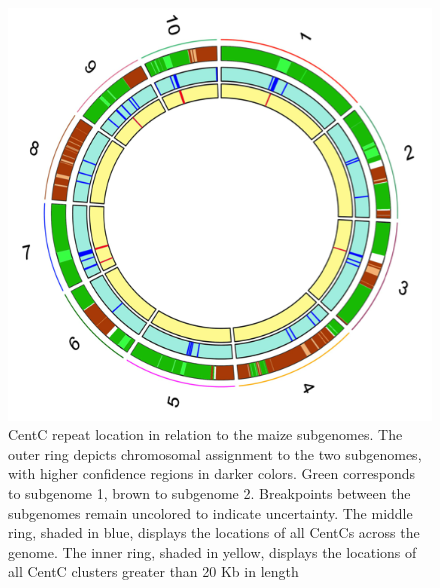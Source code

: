 \begin{figure}
\includegraphics{Fig1_circos}
\caption{CentC repeat location in relation to the maize subgenomes.  The outer ring depicts chromosomal assignment to the two subgenomes, with higher confidence regions in darker colors.  Green corresponds to subgenome 1, brown to subgenome 2.  Breakpoints between the subgenomes remain uncolored to indicate uncertainty. The middle ring, shaded in blue, displays the locations of all CentCs across the genome.  The inner ring, shaded in yellow, displays the locations of all CentC clusters greater than 20 Kb in length}
\label{circos}    
\end{figure}

